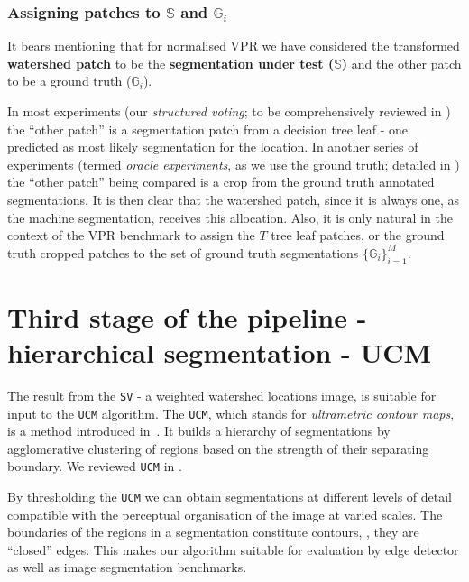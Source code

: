 
\subsubsection{Assigning patches to \texorpdfstring{$\mathbb{S}$}{S} and \texorpdfstring{$\mathbb{G}_i$}{G}}
\label{sec:ch4-asymmetry-VPR-assigning-patches-S-G}
It bears mentioning %
that for normalised VPR we have considered the transformed \textbf{watershed patch} to be the \textbf{segmentation under test ($\mathbb{S}$)} and the other patch to be a ground truth ($\mathbb{G}_i$). 

In most experiments (our {\it structured voting}; to be comprehensively %
reviewed in ) the ``other patch'' is a segmentation patch from a decision tree leaf - one predicted as most likely segmentation for the location. In another series of experiments (termed {\it oracle experiments}, as we use the ground truth; detailed in ) the ``other patch'' being compared is a crop from the ground truth annotated segmentations.
It is then clear that the watershed patch, since it is always one, as the machine segmentation, receives this allocation. Also, it is only natural in the context of the VPR benchmark to assign the $T$ tree leaf patches, or the ground truth cropped patches to the set of ground truth segmentations $\{\mathbb{G}_i\}_{i=1}^M$.

\section[Third stage of the pipeline - UCM]{Third stage of the pipeline - hierarchical segmentation - UCM}
The result from the {\tt SV} - a weighted watershed locations image, is suitable for input to the {\tt UCM} algorithm. The {\tt UCM}, which stands for {\it ultrametric contour maps}, is a method introduced in~\cite{Arbelaez2006boundary}. It builds a hierarchy of segmentations by agglomerative clustering of regions based on the strength of their separating boundary. We reviewed {\tt UCM} in . 

By thresholding the {\tt UCM} we can obtain segmentations at different levels of detail compatible with the perceptual organisation of the image at varied scales. The boundaries of the regions in a segmentation constitute contours, \ie, they are ``closed'' edges. This makes our algorithm suitable for evaluation by edge detector as well as image segmentation benchmarks.

